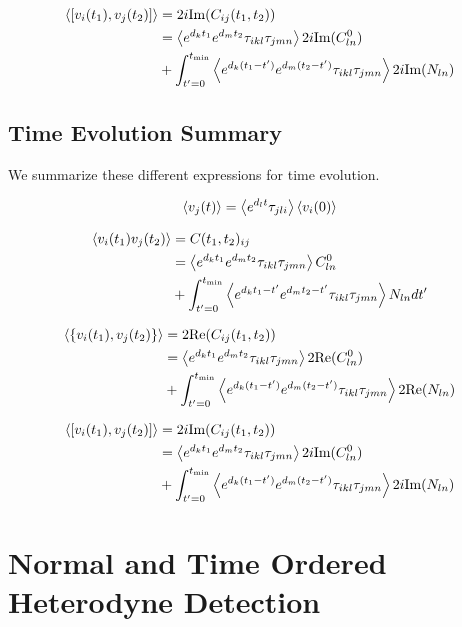 \documentclass[12pt]{article}
\begin{document}
\begin{align}
\Braket{[v_i(t_1),v_j(t_2)]} &= 2i \text{Im}(C_{ij}(t_1,t_2))\\
&= \Braket{e^{d_k t_1} e^{d_m t_2} \tau_{ikl}\tau_{jmn}}2i\text{Im}(C^0_{ln})\\ 
&+ \int_{t'=0}^{t_{\text{min}}}  \Braket{e^{d_k (t_1-t')} e^{d_m (t_2-t')} \tau_{ikl}\tau_{jmn}}2i\text{Im}(N_{ln})
\end{align}

\subsection{Time Evolution Summary}
We summarize these different expressions for time evolution.

\begin{align}
\braket{v_j(t)} = \Braket{e^{d_l t} \tau_{jli}} \Braket{v_i(0)}
\end{align}

\begin{align}
\Braket{v_i(t_1)v_j(t_2)} &= C(t_1,t_2)_{ij}\\
&= \Braket{e^{d_k t_1}e^{d_m t_2} \tau_{ikl}\tau_{jmn}} C^0_{ln}\\ &+\int_{t'=0}^{t_{\text{min}}}\Braket{e^{d_k t_1-t'}e^{d_m t_2-t'} \tau_{ikl}\tau_{jmn}} N_{ln} dt'
\end{align}

\begin{align}
\Braket{\{v_i(t_1),v_j(t_2)\}} &= 2 \text{Re}(C_{ij}(t_1,t_2))\\
&= \Braket{e^{d_k t_1} e^{d_m t_2} \tau_{ikl}\tau_{jmn}}2\text{Re}(C^0_{ln})\\ 
&+ \int_{t'=0}^{t_{\text{min}}}  \Braket{e^{d_k (t_1-t')} e^{d_m (t_2-t')} \tau_{ikl}\tau_{jmn}}2\text{Re}(N_{ln})
\end{align}

\begin{align}
\Braket{[v_i(t_1),v_j(t_2)]} &= 2i \text{Im}(C_{ij}(t_1,t_2))\\
&= \Braket{e^{d_k t_1} e^{d_m t_2} \tau_{ikl}\tau_{jmn}}2i\text{Im}(C^0_{ln})\\ 
&+ \int_{t'=0}^{t_{\text{min}}}  \Braket{e^{d_k (t_1-t')} e^{d_m (t_2-t')} \tau_{ikl}\tau_{jmn}}2i\text{Im}(N_{ln})
\end{align}

\section{Normal and Time Ordered Heterodyne Detection}
\end{document}
